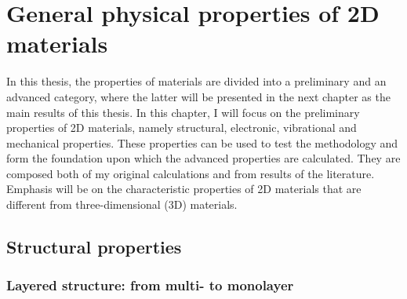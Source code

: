 
\chapter{General physical properties of 2D materials \label{chap:3}}

\ifpdf
    \graphicspath{{Chapter3/Figs/Raster/}{Chapter3/Figs/PDF/}{Chapter3/Figs/}{Chapter3/Figs/Vector/}}
\else
    \graphicspath{{Chapter3/Figs/Vector/}{Chapter3/Figs/}}
\fi

In this thesis, the properties of materials are divided into a preliminary and an advanced category, where the latter will be presented in the next chapter as the main results of this thesis. In this chapter, I will focus on the preliminary properties of 2D materials, namely structural, electronic, vibrational and mechanical properties. These properties can be used to test the methodology and form the foundation upon which the advanced properties are calculated. They are composed both of my original calculations and from results of the literature. Emphasis will be on the characteristic properties of 2D materials that are different from three-dimensional (3D) materials.

\section{Structural properties}
\subsection{Layered structure: from multi- to monolayer}

